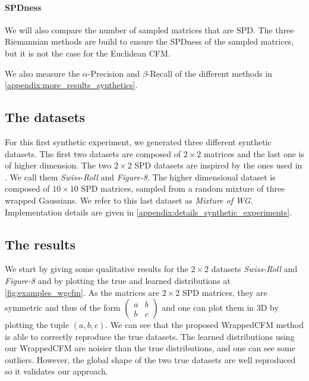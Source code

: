 \documentclass[10pt]{article} %
\theoremstyle{plain}
\theoremstyle{definition}
\theoremstyle{remark}
\begin{document}
\paragraph{SPDness} We will also compare the number of sampled matrices that are SPD. The three Riemannian methods are build to ensure the SPDness of the sampled matrices, but it is not the case for the Euclidean CFM.

We also measure the $\alpha$-Precision and $\beta$-Recall of the different methods in \cref{appendix:more_results_synthetics}.
\subsection{The datasets}
For this first synthetic experiment, we generated three different synthetic datasets. The first two datasets are composed of $2 \times 2$ matrices and the last one is of higher dimension. The two $2 \times 2$ SPD datasets are inspired by the ones used in \citet{zhoubrainflow}. We call them \emph{Swiss-Roll} and \emph{Figure-8}. %
The higher dimensional dataset is composed of $10 \times 10$ SPD matrices, sampled from a random mixture of three wrapped Gaussians. We refer to this last dataset as \textit{Mixture of WG}. Implementation details are given in \cref{appendix:details_synthetic_experiments}.

\subsection{The results}


We start by giving some qualitative results for the $2 \times 2$ datasets \emph{Swiss-Roll} and \emph{Figure-8} and  by plotting the true and learned distributions at \cref{fig:examples_wgcfm}. As the matrices are $2\times 2$ SPD matrices, they are symmetric and thus of the form $
\begin{pmatrix}a&b\\b&c
\end{pmatrix}$ and one can plot them in 3D by plotting the tuple $(a,b,c)$. We can see that the proposed WrappedCFM method is able to correctly reproduce the true datasets. The learned distributions using our WrappedCFM are noisier than the true distributions, and one can see some outliers. However, the global shape of the two true datasets are well reproduced so it validates our approach.
\end{document}
